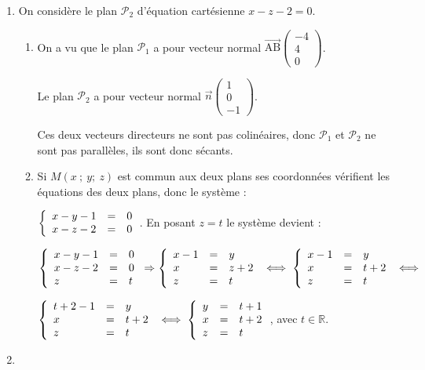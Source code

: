 \documentclass[10pt]{article}
\providecommand{\R}{\mathbb{R}}
\providecommand{\vect}[1]{\overrightarrow{#1}}
\begin{document}
\begin{enumerate}
\begin{enumerate}
EA$^2 = \text{EB}^2 \Rightarrow \text{EA} = \text{EB}$.

	\end{enumerate}	
\item On considère le plan $\mathcal{P}_2$ d'équation cartésienne $x - z - 2 = 0$.
	\begin{enumerate}
		\item 
On a vu que le plan $\mathcal{P}_1$ a pour vecteur normal $\vect{\text{AB}}\begin{pmatrix}-4\\4\\0\end{pmatrix}$.

Le plan $\mathcal{P}_2$ a pour vecteur normal $\vect{n}\begin{pmatrix}1\\0\\-1\end{pmatrix}$.

Ces deux vecteurs directeurs ne sont pas colinéaires, donc $\mathcal{P}_1$ et $\mathcal{P}_2$ ne sont pas parallèles, ils sont donc sécants.
		\item 
		






Si $M(x~;~y;~z)$ est commun aux deux plans ses coordonnées vérifient les équations des deux plans, donc le système :

$\left\{\begin{array}{l c l}
x - y - 1 &=& 0\\
x - z - 2 &=& 0
\end{array}\right.$. En posant $z = t$ le système devient :

$\left\{\begin{array}{l c l}
x - y - 1 &=& 0\\
x - z - 2 &=& 0\\
z&=&t
\end{array}\right.\Rightarrow \left\{\begin{array}{l c l}
x - 1 &=&y\\
x &=&z + 2\\
z&=&t
\end{array}\right. \iff \left\{\begin{array}{l c l}
x - 1 &=&y\\
x &=&t + 2\\
z&=&t
\end{array}\right. \iff$

$\left\{\begin{array}{l c l}
t + 2 - 1 &=&y\\
x &=&t + 2\\
z&=&t
\end{array}\right. 
\iff \left\{\begin{array}{l c l}
y&=&t + 1\\
x &=&t + 2\\
z&=&t
\end{array}\right.$, avec $t \in \R$.
	\end{enumerate}
\item  



\end{enumerate}
\end{document}

